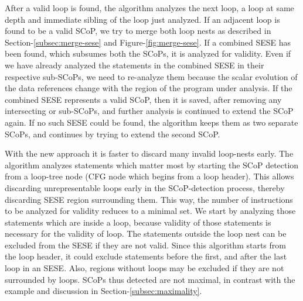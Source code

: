 \documentclass{sig-alternate}
\begin{document}
After a valid loop is found, the algorithm analyzes the next loop, a loop at
same depth and immediate sibling of the loop just analyzed.  If an adjacent loop
is found to be a valid SCoP, we try to merge both loop nests as described in
Section-\ref{subsec:merge-sese} and Figure-\ref{fig:merge-sese}.  If a combined
SESE has been found, which subsumes both the SCoPs, it is analyzed for
validity. Even if we have already analyzed the statements in the combined SESE
in their respective sub-SCoPs, we need to re-analyze them because the scalar
evolution of the data references change with the region of the program under
analysis. If the combined SESE represents a valid SCoP, then it is saved, after
removing any intersecting or sub-SCoPs, and further analysis is continued to
extend the SCoP again.  If no such SESE could be found, the algorithm keeps them
as two separate SCoPs, and continues by trying to extend the second SCoP.

With the new approach it is faster to discard many invalid loop-nests early. The
algorithm analyzes statements which matter most by starting the SCoP detection
from a loop-tree node (CFG node which begins from a loop header). This allows
discarding unrepresentable loops early in the SCoP-detection process, thereby
discarding SESE region surrounding them.  This way, the number of instructions
to be analyzed for validity reduces to a minimal set.  We start by analyzing
those statements which are inside a loop, because validity of those statements
is necessary for the validity of loop.  The statements outside the loop nest can
be excluded from the SESE if they are not valid.  Since this algorithm starts
from the loop header, it could exclude statements before the first, and after
the last loop in an SESE.  Also, regions without loops may be excluded if they
are not surrounded by loops.  SCoPs thus detected are not maximal, in contrast
with the example and discussion in Section-\ref{subsec:maximality}.


\end{document}
